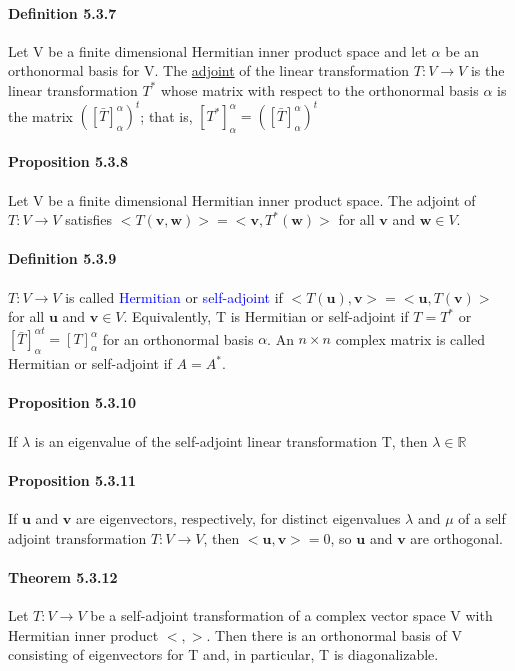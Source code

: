 \documentclass[11pt]{article}
\newcommand{\tb}[1]{\textbf{#1}}
\newcommand{\under}[1]{\underline{#1}}
\newcommand{\real}[0]{\mathbb{R}}
\newcommand{\vu}[0]{\tb{u}}
\newcommand{\vw}[0]{\tb{w}}
\newcommand{\vv}[0]{\tb{v}}
\begin{document}
{\paragraph{Definition 5.3.7} Let V be a finite dimensional Hermitian inner product space and let $\alpha$ be an orthonormal basis for V. The \under{adjoint} of the linear transformation $T: V \rightarrow V$ is the linear transformation $T^*$ whose matrix with respect to the orthonormal basis $\alpha$ is the matrix $([\bar{T}]_\alpha^\alpha)^t$; that is, $[T^*]_\alpha^\alpha = ([\bar{T}]_\alpha^\alpha)^t$
\paragraph{Proposition 5.3.8} Let V be a finite dimensional Hermitian inner product space. The adjoint of $T: V \rightarrow V$ satisfies $<T(\vv,\vw)> = <\vv, T^*(\vw)>$ for all $\vv$ and $\vw \in V$.
\paragraph{Definition 5.3.9} $T:V \rightarrow V$ is called \textcolor{blue}{Hermitian} or \textcolor{blue}{self-adjoint} if $<T(\vu), \vv> = <\vu,T(\vv)>$ for all $\vu$ and $\vv \in V$. Equivalently, T is Hermitian or self-adjoint if $T = T^*$ or $[\bar{T}]_\alpha^{\alpha t}= [T]_\alpha^\alpha$ for an orthonormal basis $\alpha$. An $n\times n$ complex matrix is called Hermitian or self-adjoint if $A = A^*$.
\paragraph{Proposition 5.3.10}
If $\lambda$ is an eigenvalue of the self-adjoint linear transformation T, then $\lambda \in \real$
\paragraph{Proposition 5.3.11} If $\vu$ and $\vv$ are eigenvectors, respectively, for distinct eigenvalues $\lambda$ and $\mu$ of a self adjoint transformation $T: V \rightarrow V$, then $<\vu, \vv> = 0$, so $\vu$ and $\vv$ are orthogonal.
\paragraph{Theorem 5.3.12} Let $T: V \rightarrow V$ be a self-adjoint transformation of a complex vector space V with Hermitian inner product $<,>$. Then there is an orthonormal basis of V consisting of eigenvectors for T and, in particular, T is diagonalizable.
}
\end{document}
